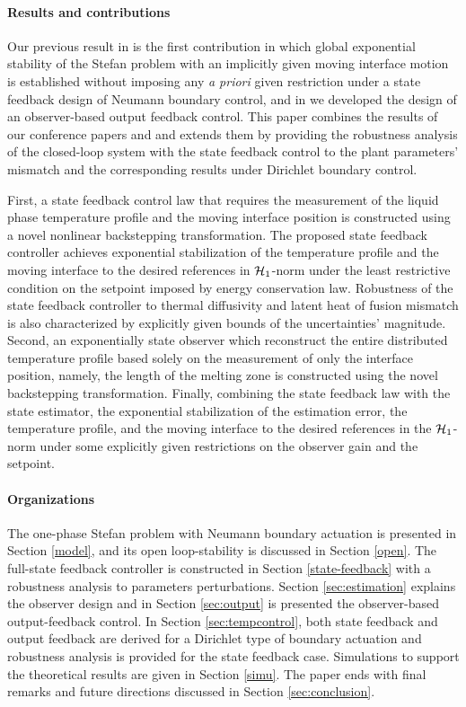 \documentclass[journal]{IEEEtran}
\begin{document}
\paragraph{Results and contributions}
Our previous result in \cite{Shumon16} is the first contribution in which global exponential stability of the Stefan problem with an implicitly given moving interface motion is established without imposing any \emph{a priori} given restriction under a state feedback design of Neumann boundary control, and in \cite{Shumon16CDC} we developed the design of an observer-based output feedback control. This paper combines the results of our conference papers \cite{Shumon16} and \cite{Shumon16CDC} and extends them by providing the robustness analysis of the closed-loop system with the state feedback control to the plant parameters' mismatch and the corresponding results under Dirichlet boundary control.

First, a state feedback control law that requires the measurement of the liquid phase temperature profile and the moving interface position is constructed using a novel nonlinear backstepping transformation.  The proposed state feedback controller achieves exponential stabilization of the temperature profile and the moving interface to the desired references in ${\cal H}_1$-norm under the least restrictive condition on the setpoint imposed by energy conservation law.  Robustness of the state feedback controller to thermal diffusivity and latent heat of fusion mismatch is also characterized by explicitly given bounds of the uncertainties' magnitude. Second, an exponentially state observer  which reconstruct the entire distributed temperature profile based solely on the measurement of only the interface position, namely, the length of the melting zone is constructed using the novel backstepping transformation. Finally, combining the state feedback law with the state estimator,  the exponential stabilization of the estimation error, the temperature profile, and the moving interface to the desired references  in the ${\cal H}_{1}$-norm under some explicitly given restrictions on the observer gain and the setpoint. 

\paragraph{Organizations}
The one-phase Stefan problem  with Neumann boundary actuation is presented  in Section \ref{model}, and its open loop-stability is discussed in Section \ref{open}. The full-state feedback controller  is constructed  in Section \ref{state-feedback} with a robustness analysis to parameters perturbations. Section \ref{sec:estimation} explains the observer design and in Section \ref{sec:output} is presented the observer-based output-feedback control. In Section \ref{sec:tempcontrol},   both state feedback and output feedback are derived for a Dirichlet type of boundary actuation and robustness analysis is provided for the state feedback case. Simulations to support the theoretical results are given in Section \ref{simu}. The paper ends with final remarks and future directions discussed in  Section \ref{sec:conclusion}.
\end{document}
